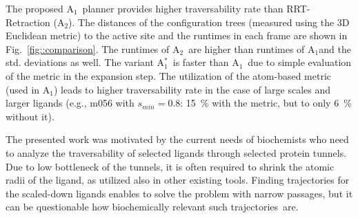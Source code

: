 \documentclass[usletter, 10pt, conference]{ieeeconf} %
\def\qrand{q_{rand}}
\def\smin{s_{min}}
\def\RA{A$_{1}$}
\def\RB{A$_{2}$}
\def\RC{A$_{1}^{*}$}
\begin{document}
The proposed \RA\ planner provides higher traversability rate than RRT-Retraction (\RB).
The distances of the configuration trees (measured using the 3D Euclidean metric) to the active site and the runtimes in each frame
are shown in Fig.~\ref{fig::comparison}.
The runtimes of \RB\ are higher than runtimes of \RA and the std. deviations as well.
The variant \RC\ is faster than \RA\ due to simple evaluation of the metric in the expansion step.
The utilization of the  atom-based metric (used in \RA) leads to higher traversability rate
in the case of large scales and larger ligands (e.g., m056 with $\smin=0.8$: 15~\% with the metric, but to only 6~\% without it).



The presented work was motivated by the current needs of biochemists who need to analyze the traversability of selected ligands through selected protein tunnels.
Due to low bottleneck of the tunnels, it is often required to shrink the atomic radii of the ligand, as utilized also in other existing tools.
Finding trajectories for the scaled-down ligands enables to solve the problem with narrow passages, but it can be questionable how biochemically relevant such trajectories~are.
\end{document}
